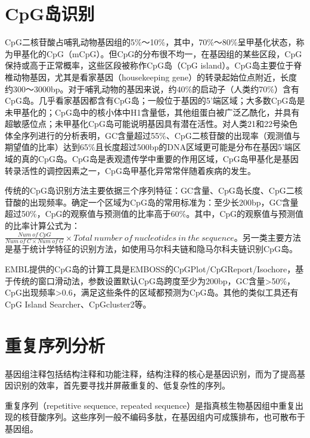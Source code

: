 \section{CpG岛识别}
CpG二核苷酸占哺乳动物基因组的5\%～10\%，其中，70\%～80\%呈甲基化状态，称为甲基化的CpG（mCpG）。但CpG的分布很不均一，在基因组的某些区段，CpG保持或高于正常概率，这些区段被称作CpG岛（CpG island）。CpG岛主要位于脊椎动物基因，尤其是看家基因（housekeeping gene）的转录起始位点附近，长度约300～3000bp。对于哺乳动物的基因来说，约40\%的启动子（人类约70\%）含有CpG岛。几乎看家基因都含有CpG岛；一般位于基因的5'端区域；大多数CpG岛是未甲基化的；CpG岛中的核小体中H1含量低，其他组蛋白被广泛乙酰化，并具有超敏感位点；未甲基化CpG岛可能说明基因具有潜在活性。对人类21和22号染色体全序列进行的分析表明，GC含量超过55\%、CpG二核苷酸的出现率（观测值与期望值的比率）达到65\%且长度超过500bp的DNA区域更可能是分布在基因5'端区域的真的CpG岛。CpG岛是表观遗传学中重要的作用区域，CpG岛甲基化是基因转录活性的调控因素之一，CpG岛甲基化异常常伴随着疾病的发生。

传统的CpG岛识别方法主要依据三个序列特征：GC含量、CpG岛长度、CpG二核苷酸的出现频率。确定一个区域为CpG岛的常用标准为：至少长200bp，GC含量超过50\%，CpG的观察值与预测值的比率高于60\%。其中，CpG的观察值与预测值的比率计算公式为：$\frac{Num\ of\ CpG}{Num\ of\ C \times Num\ of\ G} \times Total\ number\ of\ nucleotides\ in\ the\ sequence$。另一类主要方法是基于统计学特征的识别方法，如使用马尔科夫链和隐马尔科夫链识别CpG岛。

EMBL提供的CpG岛的计算工具是EMBOSS的CpGPlot/CpGReport/Isochore，基于传统的窗口滑动法，参数设置默认CpG岛跨度至少为200bp，GC含量\textgreater 50\%，CpG出现频率\textgreater 0.6，满足这些条件的区域都预测为CpG岛。其他的类似工具还有CpG Island Searcher、CpGcluster2等。

\section{重复序列分析}
基因组注释包括结构注释和功能注释，结构注释的核心是基因识别，而为了提高基因识别的效率，首先要寻找并屏蔽重复的、低复杂性的序列。

重复序列（repetitive sequence, repeated sequence）是指真核生物基因组中重复出现的核苷酸序列。这些序列一般不编码多肽，在基因组内可成簇排布，也可散布于基因组。

